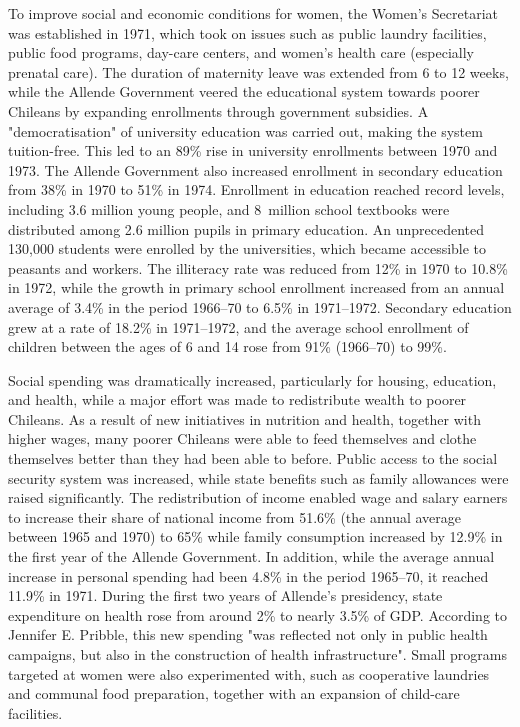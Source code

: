 To improve social and economic conditions for women, the Women's
Secretariat was established in 1971, which took on issues such as public
laundry facilities, public food programs, day-care centers, and women's
health care (especially prenatal care). The duration of maternity leave
was extended from 6 to 12 weeks, while the Allende Government veered the
educational system towards poorer Chileans by expanding enrollments
through government subsidies. A "democratisation" of university
education was carried out, making the system tuition-free. This led to
an 89\% rise in university enrollments between 1970 and 1973. The
Allende Government also increased enrollment in secondary education from
38\% in 1970 to 51\% in 1974. Enrollment in education reached record
levels, including 3.6 million young people, and 8~million school
textbooks were distributed among 2.6 million pupils in primary
education. An unprecedented 130,000 students were enrolled by the
universities, which became accessible to peasants and workers. The
illiteracy rate was reduced from 12\% in 1970 to 10.8\% in 1972, while
the growth in primary school enrollment increased from an annual average
of 3.4\% in the period 1966--70 to 6.5\% in 1971--1972. Secondary
education grew at a rate of 18.2\% in 1971--1972, and the average school
enrollment of children between the ages of 6 and 14 rose from 91\%
(1966--70) to 99\%.

Social spending was dramatically increased, particularly for housing,
education, and health, while a major effort was made to redistribute
wealth to poorer Chileans. As a result of new initiatives in nutrition
and health, together with higher wages, many poorer Chileans were able
to feed themselves and clothe themselves better than they had been able
to before. Public access to the social security system was increased,
while state benefits such as family allowances were raised
significantly. The redistribution of income enabled wage and salary
earners to increase their share of national income from 51.6\% (the
annual average between 1965 and 1970) to 65\% while family consumption
increased by 12.9\% in the first year of the Allende Government. In
addition, while the average annual increase in personal spending had
been 4.8\% in the period 1965--70, it reached 11.9\% in 1971. During the
first two years of Allende's presidency, state expenditure on health
rose from around 2\% to nearly 3.5\% of GDP. According to Jennifer E.
Pribble, this new spending "was reflected not only in public health
campaigns, but also in the construction of health infrastructure". Small
programs targeted at women were also experimented with, such as
cooperative laundries and communal food preparation, together with an
expansion of child-care facilities.

